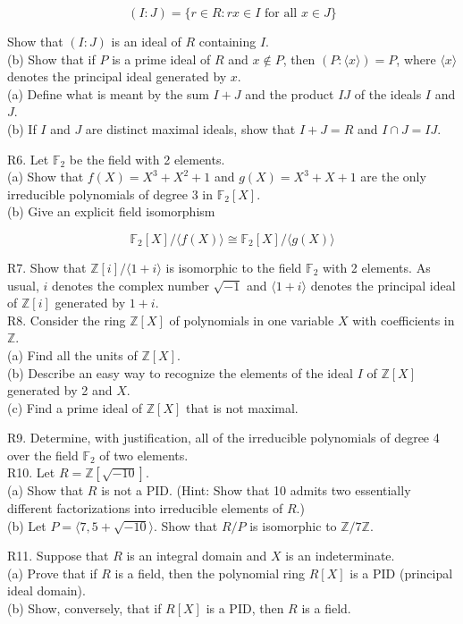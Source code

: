 $$
(I: J)=\{r \in R: r x \in I \text { for all } x \in J\}
$$

Show that $(I: J)$ is an ideal of $R$ containing $I$.\\
(b) Show that if $P$ is a prime ideal of $R$ and $x \notin P$, then $(P:\langle x\rangle)=P$, where $\langle x\rangle$ denotes the principal ideal generated by $x$.\\
(a) Define what is meant by the sum $I+J$ and the product $I J$ of the ideals $I$ and $J$.\\
(b) If $I$ and $J$ are distinct maximal ideals, show that $I+J=R$ and $I \cap J=I J$.

R6. Let $\mathbb{F}_{2}$ be the field with 2 elements.\\
(a) Show that $f(X)=X^{3}+X^{2}+1$ and $g(X)=X^{3}+X+1$ are the only irreducible polynomials of degree 3 in $\mathbb{F}_{2}[X]$.\\
(b) Give an explicit field isomorphism

$$
\mathbb{F}_{2}[X] /\langle f(X)\rangle \cong \mathbb{F}_{2}[X] /\langle g(X)\rangle
$$

R7. Show that $\mathbb{Z}[i] /\langle 1+i\rangle$ is isomorphic to the field $\mathbb{F}_{2}$ with 2 elements. As usual, $i$ denotes the complex number $\sqrt{-1}$ and $\langle 1+i\rangle$ denotes the principal ideal of $\mathbb{Z}[i]$ generated by $1+i$.\\
R8. Consider the ring $\mathbb{Z}[X]$ of polynomials in one variable $X$ with coefficients in $\mathbb{Z}$.\\
(a) Find all the units of $\mathbb{Z}[X]$.\\
(b) Describe an easy way to recognize the elements of the ideal $I$ of $\mathbb{Z}[X]$ generated by 2 and $X$.\\
(c) Find a prime ideal of $\mathbb{Z}[X]$ that is not maximal.

R9. Determine, with justification, all of the irreducible polynomials of degree 4 over the field $\mathbb{F}_{2}$ of two elements.\\
R10. Let $R=\mathbb{Z}[\sqrt{-10}]$.\\
(a) Show that $R$ is not a PID. (Hint: Show that 10 admits two essentially different factorizations into irreducible elements of $R$.)\\
(b) Let $P=\langle 7,5+\sqrt{-10}\rangle$. Show that $R / P$ is isomorphic to $\mathbb{Z} / 7 \mathbb{Z}$.

R11. Suppose that $R$ is an integral domain and $X$ is an indeterminate.\\
(a) Prove that if $R$ is a field, then the polynomial ring $R[X]$ is a PID (principal ideal domain).\\
(b) Show, conversely, that if $R[X]$ is a PID, then $R$ is a field.


